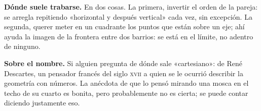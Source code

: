 \documentclass[11pt]{article}
\begin{document}
\begin{nota}
\textbf{Dónde suele trabarse.} En dos cosas. La primera, invertir el orden de la pareja: se
arregla repitiendo «horizontal y después vertical» cada vez, sin excepción. La segunda, querer
meter en un cuadrante los puntos que están sobre un eje; ahí ayuda la imagen de la frontera
entre dos barrios: se está en el límite, no adentro de ninguno.
\end{nota}

\begin{nota}
\textbf{Sobre el nombre.} Si alguien pregunta de dónde sale «cartesiano»: de René Descartes,
un pensador francés del siglo \textsc{xvii} a quien se le ocurrió describir la geometría con
números. La anécdota de que lo pensó mirando una mosca en el techo de su cuarto es bonita,
pero probablemente no es cierta; se puede contar diciendo justamente eso.
\end{nota}
\end{document}

